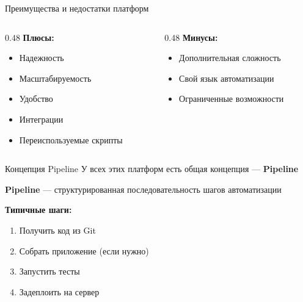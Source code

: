 \documentclass[aspectratio=169]{beamer}
\begin{document}
    \begin{frame}{Преимущества и недостатки платформ}
        \begin{columns}[t]
            \begin{column}[t]{0.48\textwidth}
                \textbf{Плюсы:}
                \begin{itemize}
                    \item {Надежность}
                    \item {Масштабируемость}
                    \item {Удобство}
                    \item {Интеграции}
                    \item Переиспользуемые скрипты
                \end{itemize}
            \end{column}
            
            \begin{column}[t]{0.48\textwidth}
                \textbf{Минусы:}
                \begin{itemize}
                    \item {Дополнительная сложность}
                    \item {Свой язык автоматизации}
                    \item {Ограниченные возможности}
                \end{itemize}
            \end{column}
        \end{columns}
    \end{frame}

    \begin{frame}{Концепция Pipeline}
        У всех этих платформ есть общая концепция — \textbf{Pipeline}
        
        \vspace{0.2cm}
        
        \textbf{Pipeline} — структурированная последовательность шагов автоматизации
        
        \vspace{0.2cm}
        
        \textbf{Типичные шаги:}
        \begin{enumerate}
            \item Получить код из Git
            \item Собрать приложение (если нужно)
            \item Запустить тесты
            \item Задеплоить на сервер
        \end{enumerate}
    \end{frame}
\end{document}
